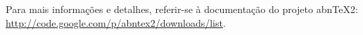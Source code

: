 \begin{multicols}{4}

\end{multicols}

Para mais informações e detalhes, referir-se à documentação do projeto abn\TeX 2: \url{http://code.google.com/p/abntex2/downloads/list}.